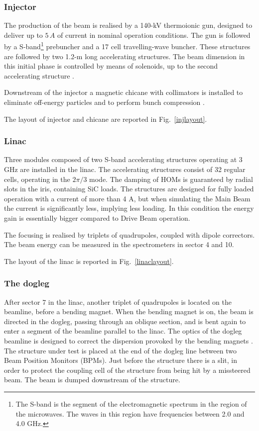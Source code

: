 \subsubsection{Injector}

The production of the beam is realised by a 140-kV thermoionic gun, designed to deliver up to $5\,A$ of current in nominal operation conditions.
The gun is followed by a S-band\footnote{The S-band is the segment of the electromagnetic spectrum in the region of the microwaves. The waves in this region have frequencies between 2.0 and 4.0 GHz.} prebuncher and a 17 cell travelling-wave buncher. These structures are followed by two 1.2-m long accelerating structures. The beam dimension in this initial phase is controlled by means of solenoids, up to the second accelerating structure \cite{ctf:injector}.

Downstream of the injector a magnetic chicane with collimators is installed to eliminate off-energy particles and to perform bunch compression  \cite{Braun:999488}.

The layout of injector and chicane are reported in Fig.~\ref{injlayout}.

\subsubsection{Linac}

Three modules composed of two S-band accelerating structures operating at 3 GHz are installed in the linac. The accelerating structures consist of 32 regular cells, operating in the $2\pi/3$ mode. The damping of HOMs is guaranteed by radial slots in the iris, containing SiC loads. The structures are designed for fully loaded operation with a current of more than 4 A, but when simulating the Main Beam the current is significantly less, implying less loading. In this condition the energy gain is essentially bigger compared to Drive Beam operation.

The focusing is realised by triplets of quadrupoles, coupled with dipole correctors. The beam energy can be measured in the spectrometers in sector 4 and 10.

The layout of the linac is reported in Fig.~\ref{linaclayout}.

\subsubsection{The dogleg}

After sector 7 in the linac, another triplet of quadrupoles is located on the beamline, before a bending magnet. When the bending magnet is on, the beam is directed in the dogleg, passing through an oblique section, and is bent again to enter a segment of the beamline parallel to the linac. The optics of the dogleg beamline is designed to correct the dispersion provoked by the bending magnets \cite{Tecker:2013eba}. The structure under test is placed at the end of the dogleg line between two Beam Position Monitors (BPMs). Just before the structure there is a slit, in order to protect the coupling cell of the structure from being hit by a missteered beam. The beam is dumped downstream of the structure.

